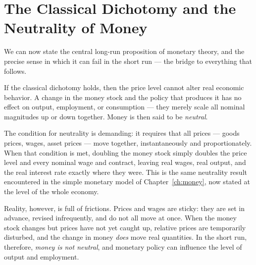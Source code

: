 \section{The Classical Dichotomy and the Neutrality of Money}

We can now state the central long-run proposition of monetary theory, and the precise sense in which it can fail in the short run --- the bridge to everything that follows.


If the classical dichotomy holds, then the price level cannot alter real economic behavior. A change in the money stock and the policy that produces it has no effect on output, employment, or consumption --- they merely scale all nominal magnitudes up or down together. Money is then said to be \emph{neutral}.


The condition for neutrality is demanding: it requires that all prices --- goods prices, wages, asset prices --- move together, instantaneously and proportionately. When that condition is met, doubling the money stock simply doubles the price level and every nominal wage and contract, leaving real wages, real output, and the real interest rate exactly where they were. This is the same neutrality result encountered in the simple monetary model of Chapter~\ref{ch:money}, now stated at the level of the whole economy.

Reality, however, is full of frictions. Prices and wages are sticky: they are set in advance, revised infrequently, and do not all move at once. When the money stock changes but prices have not yet caught up, relative prices are temporarily disturbed, and the change in money \emph{does} move real quantities. In the short run, therefore, \emph{money is not neutral}, and monetary policy can influence the level of output and employment.


